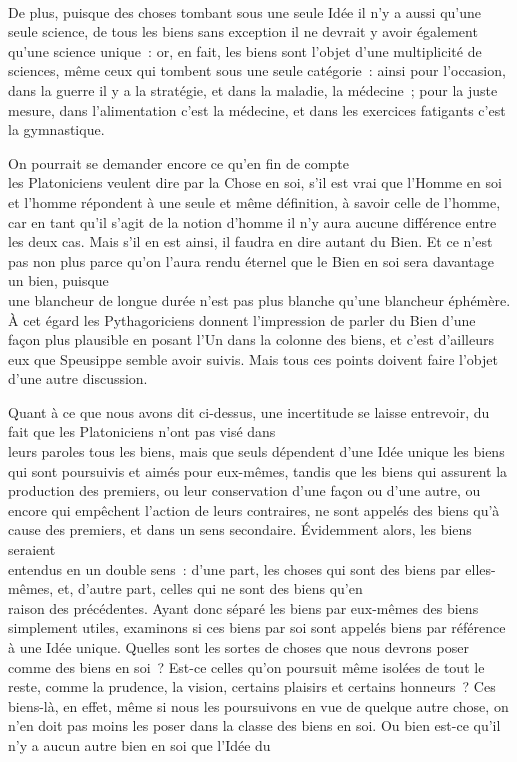 \documentclass[french,twoside]{book} %
\begin{document}
\\
De plus, puisque des choses tombant sous une seule Idée il n’y a aussi qu’une seule science, de tous les biens sans exception il ne devrait y avoir également qu’une science unique : or, en fait, les biens sont l’objet d’une multiplicité de sciences, même ceux qui tombent sous une seule catégorie : ainsi pour l’occasion, dans la guerre il y a la stratégie, et dans la maladie, la médecine ; pour la juste mesure, dans l’alimentation c’est la médecine, et dans les exercices fatigants c’est la gymnastique.\par
On pourrait se demander encore ce qu’en fin de compte \\
les Platoniciens veulent dire par la Chose en soi, s’il est vrai  que l’Homme en soi et l’homme répondent à une seule et même définition, à savoir celle de l’homme, car en tant qu’il s’agit de la notion d’homme il n’y aura aucune différence entre les deux cas. Mais s’il en est ainsi, il faudra en dire autant du Bien. Et ce n’est pas non plus parce qu’on l’aura rendu éternel que le Bien en soi sera davantage un bien, puisque \\
une blancheur de longue durée n’est pas plus blanche qu’une blancheur éphémère. À cet égard les Pythagoriciens donnent l’impression de parler du Bien d’une façon plus plausible en posant l’Un dans la colonne des biens, et c’est d’ailleurs eux que Speusippe semble avoir suivis. Mais tous ces points doivent faire l’objet d’une autre discussion.\par
Quant à ce que nous avons dit ci-dessus, une incertitude se laisse entrevoir, du fait que les Platoniciens n’ont pas visé dans \\
leurs paroles tous les biens, mais que seuls dépendent d’une Idée unique les biens qui sont poursuivis et aimés pour eux-mêmes, tandis que les biens qui assurent la production des premiers, ou leur conservation d’une façon ou d’une autre, ou encore qui empêchent l’action de leurs contraires, ne sont appelés des biens qu’à cause des premiers, et dans un sens secondaire. Évidemment alors, les biens seraient \\
entendus en un double sens : d’une part, les choses qui sont des biens par elles-mêmes, et, d’autre part, celles qui ne sont des biens qu’en \\
raison des précédentes. Ayant donc séparé les biens par eux-mêmes des biens simplement utiles, examinons si ces biens par soi sont appelés biens par référence à une Idée unique. Quelles sont les sortes de choses que nous devrons poser comme des biens en soi ? Est-ce celles qu’on poursuit même isolées de tout le reste, comme la prudence, la vision, certains plaisirs et certains honneurs ? Ces biens-là, en effet, même si nous les poursuivons en vue de quelque autre chose, on n’en doit pas moins les poser dans la classe des biens en soi. Ou bien est-ce qu’il n’y a aucun autre bien en soi que l’Idée du \\
\end{document}

